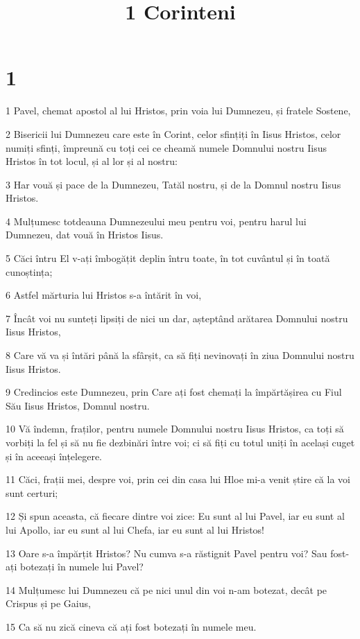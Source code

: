 

\title{1 Corinteni}


\chapter{1}

\par 1 Pavel, chemat apostol al lui Hristos, prin voia lui Dumnezeu, și fratele Sostene,
\par 2 Bisericii lui Dumnezeu care este în Corint, celor sfințiți în Iisus Hristos, celor numiți sfinți, împreună cu toți cei ce cheamă numele Domnului nostru Iisus Hristos în tot locul, și al lor și al nostru:
\par 3 Har vouă și pace de la Dumnezeu, Tatăl nostru, și de la Domnul nostru Iisus Hristos.
\par 4 Mulțumesc totdeauna Dumnezeului meu pentru voi, pentru harul lui Dumnezeu, dat vouă în Hristos Iisus.
\par 5 Căci întru El v-ați îmbogățit deplin întru toate, în tot cuvântul și în toată cunoștința;
\par 6 Astfel mărturia lui Hristos s-a întărit în voi,
\par 7 Încât voi nu sunteți lipsiți de nici un dar, așteptând arătarea Domnului nostru Iisus Hristos,
\par 8 Care vă va și întări până la sfârșit, ca să fiți nevinovați în ziua Domnului nostru Iisus Hristos.
\par 9 Credincios este Dumnezeu, prin Care ați fost chemați la împărtășirea cu Fiul Său Iisus Hristos, Domnul nostru.
\par 10 Vă îndemn, fraților, pentru numele Domnului nostru Iisus Hristos, ca toți să vorbiți la fel și să nu fie dezbinări între voi; ci să fiți cu totul uniți în același cuget și în aceeași înțelegere.
\par 11 Căci, frații mei, despre voi, prin cei din casa lui Hloe mi-a venit știre că la voi sunt certuri;
\par 12 Și spun aceasta, că fiecare dintre voi zice: Eu sunt al lui Pavel, iar eu sunt al lui Apollo, iar eu sunt al lui Chefa, iar eu sunt al lui Hristos!
\par 13 Oare s-a împărțit Hristos? Nu cumva s-a răstignit Pavel pentru voi? Sau fost-ați botezați în numele lui Pavel?
\par 14 Mulțumesc lui Dumnezeu că pe nici unul din voi n-am botezat, decât pe Crispus și pe Gaius,
\par 15 Ca să nu zică cineva că ați fost botezați în numele meu.
